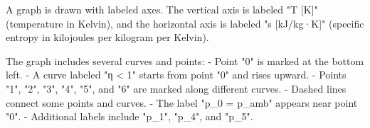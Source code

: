 A graph is drawn with labeled axes. The vertical axis is labeled "T [K]" (temperature in Kelvin), and the horizontal axis is labeled "s [kJ/kg·K]" (specific entropy in kilojoules per kilogram per Kelvin).  

The graph includes several curves and points:  
- Point "0" is marked at the bottom left.  
- A curve labeled "η < 1" starts from point "0" and rises upward.  
- Points "1", "2", "3", "4", "5", and "6" are marked along different curves.  
- Dashed lines connect some points and curves.  
- The label "p_0 = p_amb" appears near point "0".  
- Additional labels include "p_1", "p_4", and "p_5".